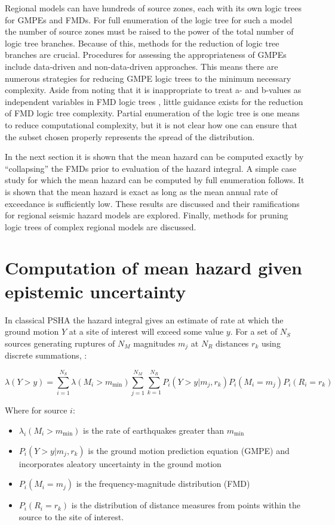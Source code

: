 \documentclass{article}
\begin{document}
Regional models can have hundreds of source zones, each with its own logic trees for GMPEs and FMDs.
For full enumeration of the logic tree for such a model the number of source zones must be raised to the power of the total number of logic tree branches.
Because of this, methods for the reduction of logic tree branches are crucial.
Procedures for assessing the appropriateness of GMPEs include data-driven \citep{scherbaum2009model, kale2013new} and non-data-driven \citep{bommer2010selection} approaches.
This means there are numerous strategies for reducing GMPE logic trees to the minimum necessary complexity.
Aside from noting that it is inappropriate to treat a- and b-values as independent variables in FMD logic trees \citep{bommer2008use}, little guidance exists for the reduction of FMD logic tree complexity.
Partial enumeration of the logic tree is one means to reduce computational complexity, but it is not clear how one can ensure that the subset chosen properly represents the spread of the distribution.

In the next section it is shown that the mean hazard can be computed exactly by ``collapsing'' the FMDs prior to evaluation of the hazard integral.
A simple case study for which the mean hazard can be computed by full enumeration follows. 
It is shown that the mean hazard is exact as long as the mean annual rate of exceedance is sufficiently low. These results are discussed and their ramifications for regional seismic hazard models are explored.
Finally, methods for pruning logic trees of complex regional models are discussed.

\section{Computation of mean hazard given epistemic uncertainty}

In classical PSHA the hazard integral gives an estimate of rate at which the ground motion $Y$ at a site of interest will exceed some value $y$. 
For a set of $N_S$ sources generating ruptures of $N_M$ magnitudes $m_j$ at $N_R$ distances $r_k$ using discrete summations,  \citep{baker2008introduction}:

\begin{equation} \label{eq:HazardIntegral} 
\lambda(Y > y) = 
\sum_{i=1}^{N_S} 
\lambda(M_i > m_\text{min}) 
\sum_{j=1}^{N_M} 
\sum_{k=1}^{N_R} 
P_i(Y > y|m_j,r_k) 
P_i(M_i=m_j) 
P_i(R_i=r_k)
\end{equation}

Where for source $i$:
\begin{itemize}
\item $\lambda_i(M_i > m_\text{min})$ is the rate of earthquakes greater than $m_\text{min}$
\item $P_i(Y > y|m_j,r_k)$ is the ground motion prediction equation (GMPE) and incorporates aleatory uncertainty in the ground motion
\item $P_i(M_i=m_j)$ is the frequency-magnitude distribution (FMD)
\item $P_i(R_i=r_k)$ is the distribution of distance measures from points within the source to the site of interest.
\end{itemize}
\end{document}
